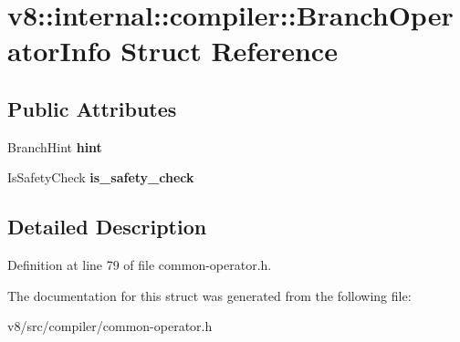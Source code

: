 \hypertarget{structv8_1_1internal_1_1compiler_1_1BranchOperatorInfo}{}\section{v8\+:\+:internal\+:\+:compiler\+:\+:Branch\+Operator\+Info Struct Reference}
\label{structv8_1_1internal_1_1compiler_1_1BranchOperatorInfo}
\subsection*{Public Attributes}
\begin{DoxyCompactItemize}
\item 
\mbox{\label{structv8_1_1internal_1_1compiler_1_1BranchOperatorInfo_ac7109f5228f66d0f9425286dfd54d9f3}} 
Branch\+Hint {\bfseries hint}
\item 
\mbox{\label{structv8_1_1internal_1_1compiler_1_1BranchOperatorInfo_a9a7b4344816e89b686ebf8b7b490956c}} 
Is\+Safety\+Check {\bfseries is\+\_\+safety\+\_\+check}
\end{DoxyCompactItemize}


\subsection{Detailed Description}


Definition at line 79 of file common-\/operator.\+h.



The documentation for this struct was generated from the following file\+:\begin{DoxyCompactItemize}
\item 
v8/src/compiler/common-\/operator.\+h\end{DoxyCompactItemize}
